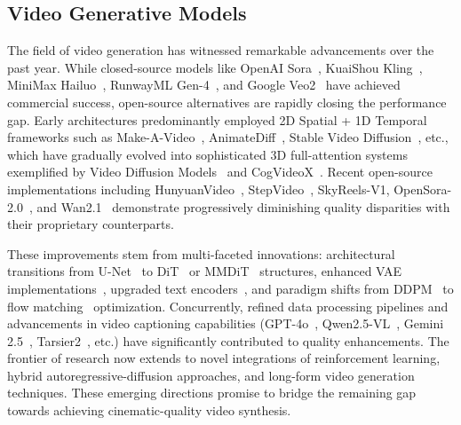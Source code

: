 \documentclass{article}
\begin{document}
\subsection{Video Generative Models}
The field of video generation has witnessed remarkable advancements over the past year. While closed-source models like OpenAI Sora~\cite{openai2024video}, KuaiShou Kling~\cite{kuaishou2024kling}, MiniMax Hailuo~\cite{minimax2024hailuo}, RunwayML Gen-4~\cite{runwayml2024gen4}, and Google Veo2~\cite{deepmind2024veo2} have achieved commercial success, open-source alternatives are rapidly closing the performance gap. Early architectures predominantly employed 2D Spatial + 1D Temporal frameworks such as Make-A-Video~\cite{singer2022make}, AnimateDiff~\cite{guo2023animatediff}, Stable Video Diffusion~\cite{blattmann2023stable}, etc., which have gradually evolved into sophisticated 3D full-attention systems exemplified by Video Diffusion Models~\cite{ho2022video} and CogVideoX~\cite{yang2024cogvideox}. Recent open-source implementations including HunyuanVideo~\cite{kong2024hunyuanvideo}, StepVideo~\cite{ma2025stepvideot2vtechnicalreportpractice}, SkyReels-V1\cite{skyreels2025}, OpenSora-2.0~\cite{peng2025open}, and Wan2.1~\cite{wan2025} demonstrate progressively diminishing quality disparities with their proprietary counterparts.

These improvements stem from multi-faceted innovations: architectural transitions from U-Net~\cite{ronneberger2015u} to DiT~\cite{Peebles2022DiT} or MMDiT~\cite{esser2024scaling} structures, enhanced VAE implementations~\cite{esser2021taming,opensora,li2024wf,zhao2024cvvae,agarwal2025cosmos,kong2024hunyuanvideo,wan2025}, upgraded text encoders~\cite{radford2021learning,raffel2020exploring,kong2024hunyuanvideo,chung2023unimax}, and paradigm shifts from DDPM~\cite{ho2020denoising,Rombach_2022_CVPR} to flow matching~\cite{lipman2022flow,esser2024scaling} optimization. Concurrently, refined data processing pipelines and advancements in video captioning capabilities (GPT-4o~\cite{gpt-4o}, Qwen2.5-VL~\cite{Qwen2.5-VL}, Gemini 2.5~\cite{GeminiPro}, Tarsier2~\cite{yuan2025tarsier2advancinglargevisionlanguage}, etc.) have significantly contributed to quality enhancements. The frontier of research now extends to novel integrations of reinforcement learning, hybrid autoregressive-diffusion approaches, and long-form video generation techniques. These emerging directions promise to bridge the remaining gap towards achieving cinematic-quality video synthesis.
\end{document}

